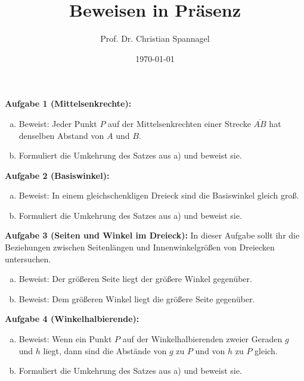 \documentclass{../cssheet}
\title{Beweisen in Präsenz}
\author{Prof. Dr. Christian Spannagel}
\date{\today}
\begin{document}
\printtitle

\textbf{Aufgabe 1 (Mittelsenkrechte):} 
\begin{enumerate}[a)]
\item Beweist: Jeder Punkt $P$ auf der Mittelsenkrechten einer Strecke $\overline{AB}$ hat denselben Abstand von $A$ und $B$.
\item Formuliert die Umkehrung des Satzes aus a) und beweist sie.
\end{enumerate}

\textbf{Aufgabe 2 (Basiswinkel):} 
\begin{enumerate}[a)]
\item Beweist: In einem gleichschenkligen Dreieck sind die Basiswinkel gleich groß.
\item Formuliert die Umkehrung des Satzes aus a) und beweist sie.
\end{enumerate}

\textbf{Aufgabe 3 (Seiten und Winkel im Dreieck):} 
In dieser Aufgabe sollt ihr die Beziehungen zwischen Seitenlängen und Innenwinkelgrößen von Dreiecken untersuchen.
\begin{enumerate}[a)]
\item Beweist: Der größeren Seite liegt der größere Winkel gegenüber.
\item Beweist: Dem größeren Winkel liegt die größere Seite gegenüber.
\end{enumerate}

\textbf{Aufgabe 4 (Winkelhalbierende):} 
\begin{enumerate}[a)]
\item Beweist: Wenn ein Punkt $P$ auf der Winkelhalbierenden zweier Geraden $g$ und $h$ liegt, dann sind die Abstände von $g$ zu $P$ und von $h$ zu $P$ gleich.
\item Formuliert die Umkehrung des Satzes aus a) und beweist sie.
\end{enumerate}

\newpage
\printlicense

\printsocials

\end{document}
